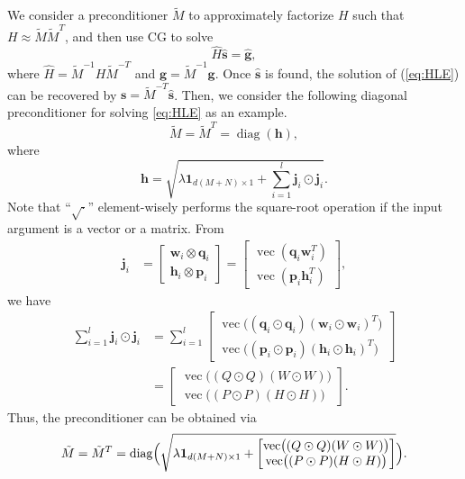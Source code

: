 \documentclass[11pt,twoside]{article}
\newcommand{\bsym}[1]{\ensuremath{\boldsymbol{#1}}}
\newcommand{\bw}{\ensuremath{\bsym{w}}}
\newcommand{\bj}{\ensuremath{\bsym{j}}}
\newcommand{\bp}{\ensuremath{\bsym{p}}}
\newcommand{\bq}{\ensuremath{\bsym{q}}}
\newcommand{\bh}{\ensuremath{\bsym{h}}}
\newcommand{\bs}{\ensuremath{\bsym{s}}}
\newcommand{\bg}{\ensuremath{\bsym{g}}}
\DeclareMathOperator*{\diag}{diag}
\DeclareMathOperator*{\vectorize}{vec}
\begin{document}
We consider a preconditioner $\tilde{M}$ to approximately factorize $H$ such that $H \approx \tilde{M}\tilde{M}^T$, and then use CG to solve
\begin{equation}
    \hat{H} \hat{\bs}  = \hat{\bg},
    \label{eq:PcondSys}
\end{equation}
where $\hat{H}=\tilde{M}^{-1}{H}\tilde{M}^{-T}$ and $\hat{\bg}=\tilde{M}^{-1}{\bg}$.
Once $\hat{\bs}$ is found, the solution of (\ref{eq:HLE}) can be recovered by ${\bs}=\tilde{M}^{-T}\hat{\bs}$. 
Then, we consider the following diagonal preconditioner for solving \eqref{eq:HLE} as an example.
\begin{equation}
    \tilde{M}=\tilde{M}^T=\diag({\bsym{h}}),
    \label{eq:Conder}
\end{equation}
where
\begin{equation*}
    {\bsym{h}} = \sqrt{ {\lambda} \bsym{1}_{d(M+N) \times 1} + \sum_{i=1}^l {\bj_i} \odot {\bj_i} }.
\end{equation*}
Note that ``$\sqrt{\cdot}$'' element-wisely performs the square-root operation if the input argument is a vector or a matrix. From 
\begin {align}
\bj_i &= \begin{bmatrix} \bw_i\otimes \bq_i \\ \bh_i\otimes \bp_i \end{bmatrix} = \begin{bmatrix} \vectorize(\bq_i \bw_i^T) \\ \vectorize(\bp_i \bh_i^T) \end{bmatrix}
\label{eq:Jacob_},
\end{align}
we have
\begin{align}
\sum_{i=1}^l {\bj_i} \odot {\bj_i}
&= \sum_{i=1}^l \begin{bmatrix} \vectorize \bigl((\bq_i \odot \bq_i) (\bw_i \odot \bw_i)^T \bigr) \\ \vectorize \bigl((\bp_i \odot \bp_i) (\bh_i \odot \bh_i)^T \bigr) \end{bmatrix} \nonumber  \\
&= \begin{bmatrix} \vectorize \bigl((Q \odot Q) (W \odot W) \bigr) \\ \vectorize \bigl((P \odot P) (H \odot H) \bigr) \end{bmatrix}
\label{eq:jj}.
\end{align}
Thus, the preconditioner can be obtained via
\begin{equation}
    \tilde{M}=\tilde{M}^T=\diag \Bigl( \sqrt{ {\lambda} \bsym{1}_{d(M+N) \times 1} + \begin{bmatrix} \vectorize \bigl((Q \odot Q) (W \odot W) \bigr) \\ \vectorize \bigl((P \odot P) (H \odot H) \bigr) \end{bmatrix} } \Bigr).
    \label{eq:Conder}
\end{equation}
\end{document}
